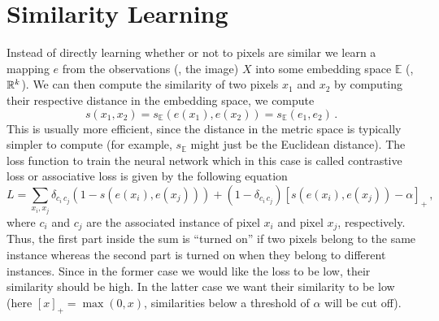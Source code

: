 \section{Similarity Learning}
Instead of directly learning whether or not to pixels are similar we learn a
mapping $e$ from the observations (\ie, the image) $X$ into some embedding space
$\mathbb{E}$ (\eg, $\mathbb{R}^k$). We can then compute the similarity of two pixels
$x_1$ and $x_2$ by computing their respective distance in the embedding space,
\ie we compute
\begin{equation*}
  s(x_1,x_2) = s_{\mathbb{E}}(e(x_1),e(x_2)) = s_{\mathbb{E}}(e_1,e_2)\,.
\end{equation*}
This is usually more efficient, since the distance in the metric space is
typically simpler to compute (for example, $s_{\mathbb{E}}$ might just be the
Euclidean distance). The loss function to train the neural network which in this
case is called contrastive loss or associative loss is given by the following
equation
\begin{equation*}
  L = \sum_{x_i,x_j} \delta_{c_i\,c_j}(1 - s(e(x_i), e(x_j))) + (1 - \delta_{c_i\,c_j}){[s(e(x_i),e(x_j)) - \alpha]}_+\,,
\end{equation*}
where $c_i$ and $c_j$ are the associated instance of pixel $x_i$ and pixel
$x_j$, respectively. Thus, the first part inside the sum is ``turned on'' if two
pixels belong to the same instance whereas the second part is turned on when
they belong to different instances. Since in the former case we would like the
loss to be low, \ie their similarity should be high. In the latter case we want
their similarity to be low (here ${[x]}_+ = \max(0,x)$, \ie similarities below a
threshold of $\alpha$ will be cut off).


